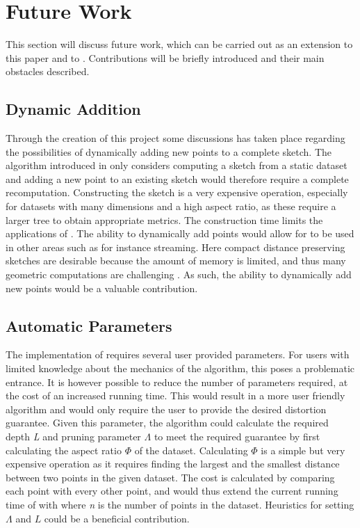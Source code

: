 \section{Future Work}
\label{futurework}
This section will discuss future work, which can be carried out as an extension to this paper and to \cite{wagner17}. Contributions will be briefly introduced and their main obstacles described. 

\subsection{Dynamic Addition}
Through the creation of this project some discussions has taken place regarding the possibilities of dynamically adding new points to a complete sketch. The algorithm introduced in \cite{wagner17} only considers computing a sketch from a static dataset and adding a new point to an existing sketch would therefore require a complete recomputation. Constructing the sketch is a very expensive operation, especially for datasets with many dimensions and a high aspect ratio, as these require a larger tree to obtain appropriate metrics. The construction time limits the applications of \qs{}. The ability to dynamically add points would allow for \qs{} to be used in other areas such as for instance streaming. Here compact distance preserving sketches are desirable because the amount of memory is limited, and thus many geometric computations are  challenging \cite{ShanM}. As such, the ability to dynamically add new points would be a valuable contribution. 

\subsection{Automatic Parameters}
The implementation of \qs{} requires several user provided parameters. For users with limited knowledge about the mechanics of the algorithm, this poses a problematic entrance. It is however possible to reduce the number of parameters required, at the cost of an increased running time. This would result in a more user friendly algorithm and would only require the user to provide the desired distortion guarantee. Given this parameter, the algorithm could calculate the required depth \textit{L} and pruning parameter $\Lambda$ to meet the required guarantee by first calculating the aspect ratio $\Phi$ of the dataset. Calculating $\Phi$ is a simple but very expensive operation as it requires finding the largest and the smallest distance between two points in the given dataset. The cost is calculated by comparing each point with every other point, and would thus extend the current running time of \qs{} with  where \textit{n} is the number of points in the dataset. Heuristics for setting $\Lambda$ and $L$ could be a beneficial contribution. 

